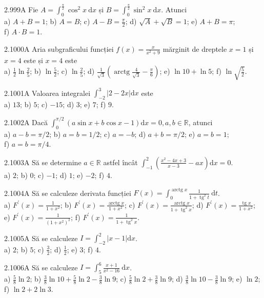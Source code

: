 \documentclass[11pt]{article}
\begin{document}
2.999A Fie $A=\int_{0}^{\frac{\pi}{2}} \cos ^{2} x \mathrm{~d} x$ și $B=\int_{0}^{\frac{\pi}{2}} \sin ^{2} x \mathrm{~d} x$. Atunci\\ a) $A+B=1$; b) $A=B$; c) $A-B=\frac{\pi}{2}$; d) $\sqrt{A}+\sqrt{B}=1$; e) $A+B=\pi$;\\ f) $A \cdot B=1$.

2.1000A Aria subgraficului funcției $f(x)=\frac{x}{x^{2}+9}$ mărginit de dreptele $x=1$ și $x=4$ este și $x=4$ este\\ a) $\frac{1}{2} \ln \frac{2}{5}$; b) $\ln \frac{5}{2}$; c) $\ln \frac{2}{5}$; d) $\frac{1}{\sqrt{3}}\left(\operatorname{arctg} \frac{4}{\sqrt{3}}-\frac{\pi}{6}\right)$; e) $\ln 10+\ln 5$; f) $\ln \sqrt{\frac{5}{2}}$.

2.1001A Valoarea integralei $\int_{-2}^{3}|2-2 x| \mathrm{d} x$ este\\ a) $13$; b) $5$; c) $-15$; d) $3$; e) $7$; f) $9$.

2.1002A Dacă $\int_{0}^{\pi / 2}(a \sin x+b \cos x-1) \mathrm{d} x=0, a, b \in \mathbb{R}$, atunci\\ a) $a-b=\pi / 2$; b) $a=b=1 / 2$; c) $a=-b$; d) $a+b=\pi / 2$; e) $a=b=1$;\\ f) $a=b=\pi / 4$.

2.1003A Să se determine $a \in \mathbb{R}$ astfel încât $\int_{-1}^{2}\left(\frac{x^{2}-4 x+3}{x-3}-a x\right) \mathrm{d} x=0$.\\ a) $2$; b) $0$; c) $-1$; d) $1$; e) $-2$; f) $4$.

2.1004A Să se calculeze derivata funcției $F(x)=\int_{0}^{\operatorname{arctg} x} \frac{1}{1+\operatorname{tg}^{2} t} \mathrm{~d} t$.\\ a) $F^{\prime}(x)=\frac{1}{1+x^{2}}$; b) $F^{\prime}(x)=\frac{\operatorname{arctg} x}{1+x^{2}}$; c) $F^{\prime}(x)=\frac{\operatorname{arctg} x}{1+\operatorname{tg}^{2} x}$; d) $F^{\prime}(x)=\frac{\operatorname{tg} x}{1+x^{2}}$;\\ e) $F^{\prime}(x)=\frac{1}{\left(1+x^{2}\right)^{2}}$; f) $F^{\prime}(x)=\frac{1}{1+\operatorname{tg}^{2} x}$.

2.1005A Să se calculeze $I=\int_{-2}^{2}|x-1| \mathrm{d} x$.\\ a) $2$; b) $5$; c) $\frac{3}{2}$; d) $\frac{1}{2}$; e) $3$; f) $4$.

2.1006A Să se calculeze $I=\int_{5}^{6} \frac{x+1}{x^{2}-16} \mathrm{~d} x$.\\ a) $\frac{5}{8} \ln 2$; b) $\frac{3}{8} \ln 10+\frac{5}{8} \ln 2-\frac{3}{8} \ln 9$; c) $\frac{5}{8} \ln 2+\frac{3}{8} \ln 9$; d) $\frac{3}{8} \ln 10-\frac{3}{8} \ln 9$; e) $\ln 2$; f) $\ln 2+2 \ln 3$.
\end{document}
